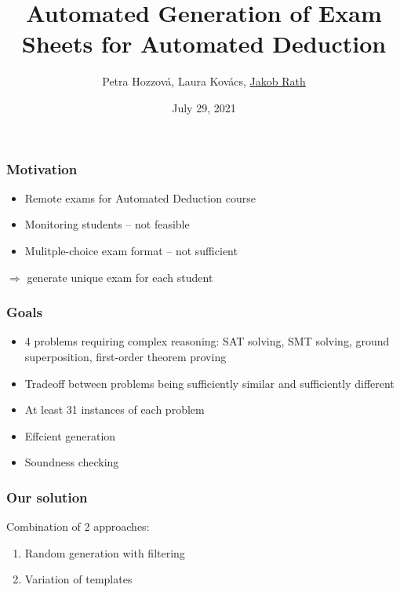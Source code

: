 \documentclass[xcolor={table}]{beamer}
\title{Automated Generation of Exam Sheets for Automated Deduction} %
\author{Petra Hozzov\'a, Laura Kov\'acs, \underline{Jakob Rath}} %
\institute{
Vienna University of Technology%
}
\date{\vspace*{-3em}\small July 29, 2021} %
\begin{document}
\begin{frame}[plain]
\titlepage %
\end{frame}
\addtocounter{framenumber}{-1}



\begin{frame}
\frametitle{Motivation}
\begin{itemize}
\item Remote exams for Automated Deduction course
\item Monitoring students -- not feasible
\item Mulitple-choice exam format -- not sufficient
\end{itemize}
\pause
  \vspace*{1em}
\qquad $\Rightarrow$ generate unique exam for each student
\end{frame}



\begin{frame}
\frametitle{Goals}
\begin{itemize}
\item 4 problems requiring complex reasoning:
  SAT solving, SMT solving, ground superposition, first-order theorem proving
\item Tradeoff between problems being sufficiently similar and sufficiently different
\item At least 31 instances of each problem
\item Effcient generation
\item Soundness checking
\end{itemize}
\end{frame}



\begin{frame}
\frametitle{Our solution}
Combination of 2 approaches:
\begin{enumerate}
\item Random generation with filtering
\item Variation of templates
\end{enumerate}
\end{frame}
\end{document}

